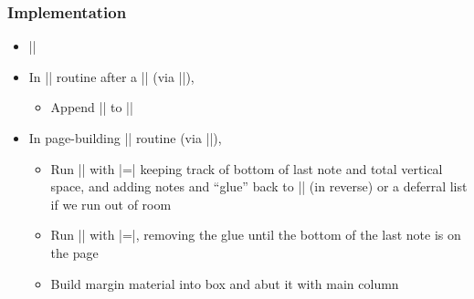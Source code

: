 \documentclass{beamer}
\begin{document}
\begin{frame}[fragile]
  \frametitle{Implementation}
  \begin{itemize}
  \item |\newtoks\marginlist|
    \vskip0.5pc
  \item In |\output| routine after a |\marginpar| {\small(via |\@addmarginpar|)},
    \vskip-0.35pc
    \begin{itemize}
    \item Append |\note{\BOX}{\@pageht}| to |\marginlist|
    \end{itemize}
    \vskip0.5pc
  \item In page-building |\output| routine {\small(via |\@combinefloats|)},
    \begin{itemize}
    \item Run |\marginlist| with |\note=\note@down| keeping track of
      bottom of last note and total vertical space, and adding notes
      and ``glue'' back to |\marginlist| (in reverse) or a deferral
      list if we run out of room
    \item Run |\marginlist| with |\note=\note@up|, removing the glue
      until the bottom of the last note is on the page
    \item Build margin material into box and abut it with main column
    \end{itemize}
  \end{itemize}
\end{frame}
\end{document}
